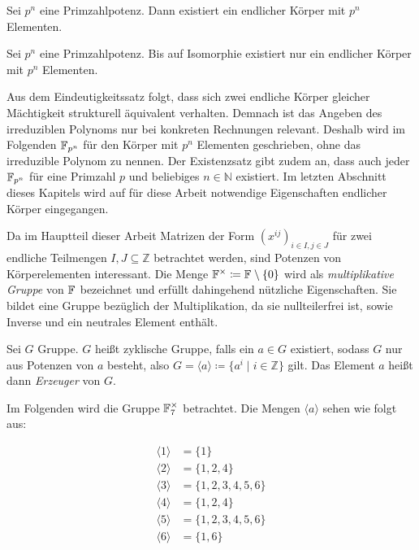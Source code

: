 \begin{satz}
    Sei $p^n$ eine Primzahlpotenz. Dann existiert ein endlicher Körper mit $p^n$ Elementen.
\end{satz}

\begin{satz}
    Sei $p^n$ eine Primzahlpotenz. Bis auf Isomorphie existiert nur ein endlicher Körper mit $p^n$ Elementen.
\end{satz}

Aus dem Eindeutigkeitssatz folgt, dass sich zwei endliche Körper gleicher Mächtigkeit strukturell äquivalent verhalten. Demnach ist das Angeben des irreduziblen Polynoms nur bei konkreten Rechnungen relevant. Deshalb wird im Folgenden $\field{p}[n]$ für den Körper mit $p^n$ Elementen geschrieben, ohne das irreduzible Polynom zu nennen. Der Existenzsatz gibt zudem an, dass auch jeder $\field{p}[n]$ für eine Primzahl $p$ und beliebiges $n \in \mathbb{N}$ existiert. Im letzten Abschnitt dieses Kapitels wird auf für diese Arbeit notwendige Eigenschaften endlicher Körper eingegangen.

Da im Hauptteil dieser Arbeit Matrizen der Form $\left( x^{ij} \right)_{i \in I,j \in J}$ für zwei endliche Teilmengen $I,J \subseteq \mathbb{Z}$ betrachtet werden, sind Potenzen von Körperelementen interessant. Die Menge $\field{}^\times \coloneqq \field{} \setminus \{0\}$ wird als \emph{multiplikative Gruppe} von $\field{}$ bezeichnet und erfüllt dahingehend nützliche Eigenschaften. Sie bildet eine Gruppe bezüglich der Multiplikation, da sie nullteilerfrei ist, sowie Inverse und ein neutrales Element enthält.

\begin{definition}
    Sei $G$ Gruppe. $G$ heißt zyklische Gruppe, falls ein $a \in G$ existiert, sodass $G$ nur aus Potenzen von $a$ besteht, also $G = \langle a \rangle \coloneqq \{ a^i \mid i \in \mathbb{Z}\}$ gilt. Das Element $a$ heißt dann \emph{Erzeuger} von $G$.
\end{definition}

Im Folgenden wird die Gruppe $\field{7}^\times$ betrachtet. Die Mengen $\langle a \rangle$ sehen wie folgt aus:

\begin{align*}
    \langle 1 \rangle &= \{ 1\} \\
    \langle 2 \rangle &= \{ 1,2,4\} \\
    \langle 3 \rangle &= \{ 1,2,3,4,5,6\} \\
    \langle 4 \rangle &= \{ 1,2,4\} \\
    \langle 5 \rangle &= \{ 1,2,3,4,5,6\} \\
    \langle 6 \rangle &= \{ 1,6\} \\
\end{align*}

